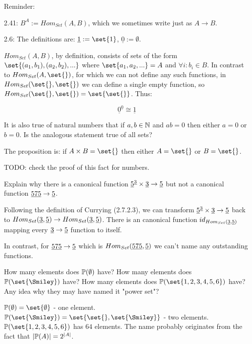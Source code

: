 \documentclass{article}
\begin{document}
\ans

Reminder:

2.41: $B^A := Hom_{Set}(A,B)$, which we sometimes write just as $A \to B$.

2.6: The definitions are: $\underline{1} := \set{1}$, $\underline{0} := \emptyset$.

\vsp

$Hom_{Set}(A,B)$, by definition, consists of sets of the form
$\set{(a_1,b_1),(a_2,b_2),...}$ where $\set{a_1, a_2, ...} = A$ and $\forall i:
b_i \in B$.  In contrast to $Hom_{Set}(A,\set{})$, for which we can not define
any such functions, in $Hom_{Set}(\set{}, \set{})$ we can define a single empty
function, so $Hom_{Set}(\set{}, \set{}) = \set{\set{}}$. Thus:

\[
  \underline{0}^{\underline{0}} \cong \underline{1}
\]


It is also true of natural numbers that if $a, b \in \mathbb{N}$ and $ab = 0$ then either
$a = 0$ or $b = 0$. Is the analogous statement true of all sets?

\ans

The proposition is: if $A \times B = \set{}$ then either $A = \set{}$ or $B = \set{}$.

TODO: check the proof of this fact for numbers.


Explain why there is a canonical function ${\underline{5}}^{\underline{3}} \times {\underline{3}} \to {\underline{5}}$ but not a
canonical function ${\underline{575}} \to {\underline{5}}$.

\ans

Following the definition of Currying (2.7.2.3), we can transform ${\underline{5}}^{\underline{3}}
\times {\underline{3}} \to {\underline{5}}$ back to $Hom_{Set}({\underline{3}},{\underline{5}}) \to
Hom_{Set}({\underline{3}},{\underline{5}})$.  There is an canonical function
$id_{Hom_{Set}({\underline{3}},{\underline{5}})}$ mapping every ${\underline{3}} \to {\underline{5}}$ function to
itself.

In contrast, for ${\underline{575}} \to {\underline{5}}$ which is $Hom_{Set}({\underline{575}},{\underline{5}})$ we
can't name any outstanding functions.


\es How many elements does $\mathbb{P}(\emptyset)$ have?
\ei How many elements does $\Pow(\set{\Smiley})$ have?
\ei How many elements does $\Pow(\set{1, 2, 3, 4, 5, 6})$ have?
\ei Any idea why they may have named it "power set"?
\ee

\ans

\es $\Pow(\emptyset) = \set{\emptyset}$ - one element.
\ei $\Pow(\set{\Smiley}) = \set{\set{}, \set{\Smiley}}$ - two elements.
\ei $\Pow(\set{1, 2, 3, 4, 5, 6})$ has $64$ elements.
\ei The name probably originates from the fact that $|\mathbb{P}(A)| = 2^{|A|}$.
\ee
\end{document}
